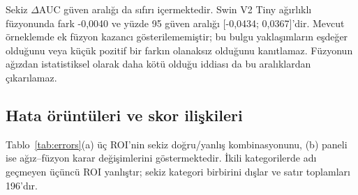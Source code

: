 \documentclass[a4paper]{elektr}
\begin{document}
Sekiz $\Delta$AUC güven aralığı da sıfırı içermektedir. Swin V2 Tiny ağırlıklı füzyonunda fark -0,0040 ve yüzde 95 güven aralığı [-0,0434; 0,0367]'dir. Mevcut örneklemde ek füzyon kazancı gösterilememiştir; bu bulgu yaklaşımların eşdeğer olduğunu veya küçük pozitif bir farkın olanaksız olduğunu kanıtlamaz. Füzyonun ağızdan istatistiksel olarak daha kötü olduğu iddiası da bu aralıklardan çıkarılamaz.

\subsection{Hata örüntüleri ve skor ilişkileri}
Tablo~\ref{tab:errors}(a) üç ROI'nin sekiz doğru/yanlış kombinasyonunu, (b) paneli ise ağız--füzyon karar değişimlerini göstermektedir. İkili kategorilerde adı geçmeyen üçüncü ROI yanlıştır; sekiz kategori birbirini dışlar ve satır toplamları 196'dır.
\end{document}
